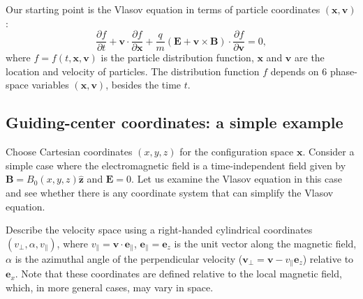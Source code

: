 \documentclass{llncs}
\begin{document}
Our starting point is the Vlasov equation in terms of particle coordinates
$(\mathbf{x}, \mathbf{v})$:
\begin{equation}
  \label{22-11-12-1} \frac{\partial f}{\partial t} +\mathbf{v} \cdot
  \frac{\partial f}{\partial \mathbf{x}} + \frac{q}{m} (\mathbf{E}+\mathbf{v}
  \times \mathbf{B}) \cdot \frac{\partial f}{\partial \mathbf{v}} = 0,
\end{equation}
where $f = f (t, \mathbf{x}, \mathbf{v})$ is the particle distribution
function, $\mathbf{x}$ and $\mathbf{v}$ are the location and velocity of
particles. The distribution function $f$ depends on 6 phase-space variables
$(\mathbf{x}, \mathbf{v})$, besides the time $t$.

\subsection{Guiding-center coordinates: a simple example}\label{19-4-23-p1}

Choose Cartesian coordinates $(x, y, z)$ for the configuration space
$\mathbf{x}$. Consider a simple case where the electromagnetic field is a
time-independent field given by $\mathbf{B}= B_0 (x, y, z) \hat{\mathbf{z}}$
and $\mathbf{E}= 0$. Let us examine the Vlasov equation in this case and see
whether there is any coordinate system that can simplify the Vlasov equation.

Describe the velocity space using a right-handed cylindrical coordinates
$(v_{\perp}, \alpha, v_{\parallel})$, where $v_{\parallel} =\mathbf{v} \cdot
\mathbf{e}_{\parallel}$, $\mathbf{e}_{\parallel} =\mathbf{e}_z$ is the unit
vector along the magnetic field, $\alpha$ is the azimuthal angle of the
perpendicular velocity ($\mathbf{v}_{\perp} =\mathbf{v}- v_{\parallel}
\mathbf{e}_z$) relative to $\mathbf{e}_x$. Note that these coordinates are
defined relative to the local magnetic field, which, in more general cases,
may vary in space.
\end{document}
